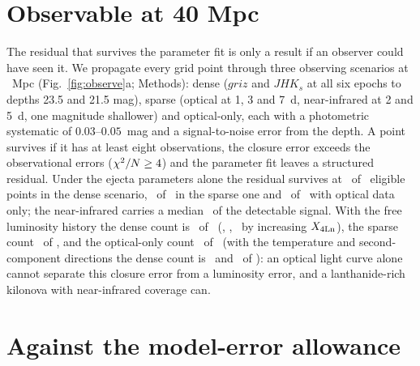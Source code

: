 \documentclass[11pt]{article}
\newcommand{\Xlan}{X_{\rm 4Ln}}
\begin{document}
\section{Observable at 40 Mpc}\label{sec:observable}

The residual that survives the parameter fit is only a result if an observer could have seen it. We propagate every grid point through three observing scenarios at \Distance\ Mpc (Fig.~\ref{fig:observe}a; Methods): dense ($griz$ and $JHK_s$ at all six epochs to depths 23.5 and 21.5 mag), sparse (optical at 1, 3 and 7~d, near-infrared at 2 and 5~d, one magnitude shallower) and optical-only, each with a photometric systematic of $0.03$--$0.05$~mag and a signal-to-noise error from the depth. A point survives if it has at least eight observations, the closure error exceeds the observational errors ($\chi^2/N\ge4$) and the parameter fit leaves a structured residual. Under the ejecta parameters alone the residual survives at \DenseSurvives\ of \DenseEligible\ eligible points in the dense scenario, \SparseSurvives\ of \SparseEligible\ in the sparse one and \OpticalSurvives\ of \OpticalEligible\ with optical data only; the near-infrared carries a median \DenseNIRShare\ of the detectable signal. With the free luminosity history the dense count is \DenseTOne\ of \DenseEligible\ (\DenseTOneXlow, \DenseTOneXmid, \DenseTOneXhigh\ by increasing $\Xlan$), the sparse count \SparseTOne\ of \SparseTOneEligible, and the optical-only count \OpticalTOne\ of \OpticalTOneEligible\ (with the temperature and second-component directions the dense count is \DenseTTwo\ and \DenseTThree\ of \DenseEligible): an optical light curve alone cannot separate this closure error from a luminosity error, and a lanthanide-rich kilonova with near-infrared coverage can.  %

\section{Against the model-error allowance}\label{sec:allowance}
\end{document}
